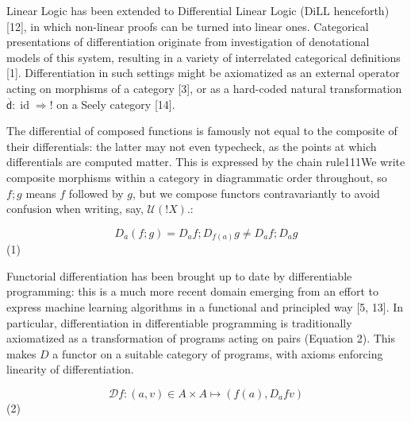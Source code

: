 \documentclass[10pt,a4paper]{article}
\newcommand{\oc}{!}
\begin{document}
 
 
Linear Logic has been extended to Differential Linear Logic ($\mathrm{DiLL}$ henceforth) [12], in which non-linear proofs can be turned into linear ones. Categorical presentations of differentiation originate from investigation of denotational models of this system, resulting in a variety of interrelated categorical definitions [1]. Differentiation in such settings might be axiomatized as an external operator acting on morphisms of a category [3], or as a hard-coded natural transformation $\overline{\mathsf{d}}:\operatorname{id}\Rightarrow\oc$ on a Seely category [14].\par
 
 
 
The differential of composed functions is famously not equal to the composite of their differentials: the latter may not even typecheck, as the points at which differentials are computed matter. This is expressed by the chain rule111We write composite morphisms within a category in diagrammatic order throughout, so $f;g$ means $f$ followed by $g$, but we compose functors contravariantly to avoid confusion when writing, say, $\mathcal{U}(\oc X)$.:\par
    \[D_{a}(f;g)=D_{a}f;D_{f(a)}g\neq D_{a}f;D_{a}g\]  (1)   
 
 
Functorial differentiation has been brought up to date by differentiable programming: this is a much more recent domain emerging from an effort to express machine learning algorithms in a functional and principled way [5, 13]. In particular, differentiation in differentiable programming is traditionally axiomatized as a transformation of programs acting on pairs (Equation 2). This makes $D$ a functor on a suitable category of programs, with axioms enforcing linearity of differentiation.\par
    \[\mathcal{D}f:(a,v)\in A\times A\mapsto(f(a),D_{a}fv)\]  (2)   
 
 
\end{document}
